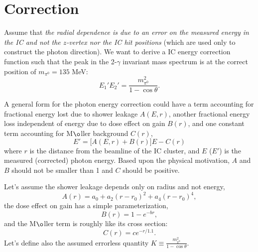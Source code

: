 \documentclass[amsmath,amssymb,notitlepage,11pt]{revtex4-1}
\begin{document}
\newpage
\section{Correction}
Assume that {\it the radial dependence is due to an error on the measured energy in the IC and not the $z$-vertex nor the IC hit positions} (which are used only to construct the photon direction).  We want to derive a IC energy correction function such that the peak in the 2-$\gamma$ invariant mass spectrum is at the correct position of $m_{\pi^0}=135$ MeV:
\begin{equation}
    E_1'E_2'=\frac{m^2_{\pi^0}}{1-\cos\theta}.
    \label{}
\end{equation}

A general form for the photon energy correction could have a term accounting for fractional energy lost due to shower leakage $A(E,r)$, another fractional energy loss independent of energy due to dose effect on gain $B(r)$, and one constant term accounting for M$\o$ller background $C(r)$,
\begin{equation}
E'=\biggr[A(E,r) + B(r)\biggr]E - C(r)
    \label{}
\end{equation}
where $r$ is the distance from the beamline of the IC cluster, and $E$ ($E'$) is the measured (corrected) photon energy.  Based upon the physical motivation, $A$ and $B$ should not be smaller than 1 and $C$ should be positive.

Let's assume the shower leakage depends only on radius and not energy,
\begin{equation}
    A(r)=a_0+a_2(r-r_0)^2+a_4(r-r_0)^4,
    \label{}
\end{equation}
the dose effect on gain has a simple parameterization,
\begin{equation}
    B(r)=1-e^{-br},
    \label{}
\end{equation}
and the M$\o$ller term is roughly like its cross section:
\begin{equation}
    C(r)=ce^{-r/1.1}.
    \label{}
\end{equation}
Let's define also the assumed errorless quantity $K\equiv\frac{m_{\pi^0}^2}{1-\cos\theta}$.
\newpage
\end{document}
